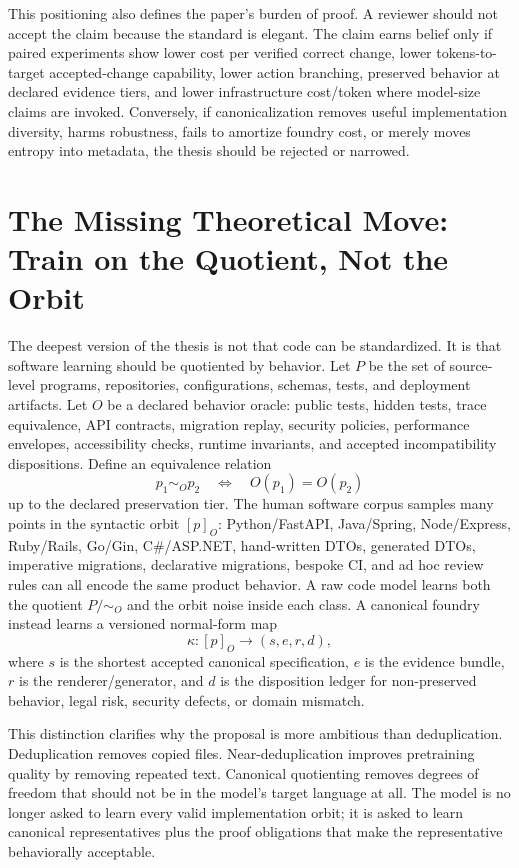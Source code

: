 This positioning also defines the paper's burden of proof. A reviewer should not accept the claim because the standard is elegant. The claim earns belief only if paired experiments show lower cost per verified correct change, lower tokens-to-target accepted-change capability, lower action branching, preserved behavior at declared evidence tiers, and lower infrastructure cost/token where model-size claims are invoked. Conversely, if canonicalization removes useful implementation diversity, harms robustness, fails to amortize foundry cost, or merely moves entropy into metadata, the thesis should be rejected or narrowed.

\section{The Missing Theoretical Move: Train on the Quotient, Not the Orbit}
\label{sec:quotient}

The deepest version of the thesis is not that code can be standardized. It is that software learning should be quotiented by behavior. Let $P$ be the set of source-level programs, repositories, configurations, schemas, tests, and deployment artifacts. Let $O$ be a declared behavior oracle: public tests, hidden tests, trace equivalence, API contracts, migration replay, security policies, performance envelopes, accessibility checks, runtime invariants, and accepted incompatibility dispositions. Define an equivalence relation
\begin{equation}
p_1 \sim_O p_2 \quad \Longleftrightarrow \quad O(p_1)=O(p_2)
\end{equation}
up to the declared preservation tier. The human software corpus samples many points in the syntactic orbit $[p]_O$: Python/FastAPI, Java/Spring, Node/Express, Ruby/Rails, Go/Gin, C\#/ASP.NET, hand-written DTOs, generated DTOs, imperative migrations, declarative migrations, bespoke CI, and ad hoc review rules can all encode the same product behavior. A raw code model learns both the quotient $P/{\sim_O}$ and the orbit noise inside each class. A canonical foundry instead learns a versioned normal-form map
\begin{equation}
\kappa: [p]_O \rightarrow (s,e,r,d),
\end{equation}
where $s$ is the shortest accepted canonical specification, $e$ is the evidence bundle, $r$ is the renderer/generator, and $d$ is the disposition ledger for non-preserved behavior, legal risk, security defects, or domain mismatch.

This distinction clarifies why the proposal is more ambitious than deduplication. Deduplication removes copied files. Near-deduplication improves pretraining quality by removing repeated text. Canonical quotienting removes degrees of freedom that should not be in the model's target language at all. The model is no longer asked to learn every valid implementation orbit; it is asked to learn canonical representatives plus the proof obligations that make the representative behaviorally acceptable.

